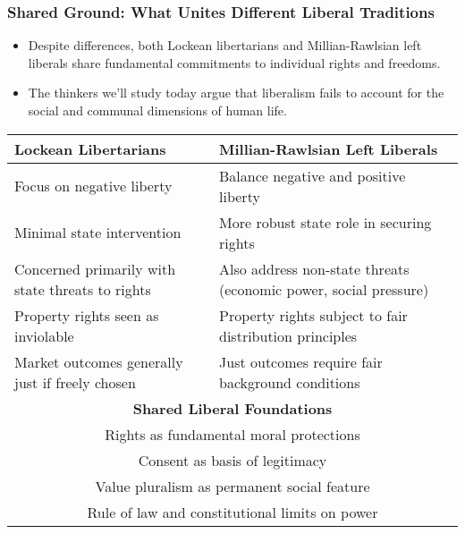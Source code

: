 \documentclass{beamer}
\begin{document}
\begin{frame}
    \frametitle{Shared Ground: What Unites Different Liberal Traditions}
    \begin{itemize}
        \item Despite differences, both Lockean libertarians and Millian-Rawlsian left liberals share fundamental commitments to individual rights and freedoms.
        \item The thinkers we'll study today argue that liberalism fails to account for the social and communal dimensions of human life.
    \end{itemize}
    
    \begin{center}
        \scriptsize
    \begin{tabular}{p{5cm}|p{5cm}}
      \toprule
    \textbf{Lockean Libertarians} & \textbf{Millian-Rawlsian Left Liberals} \\
    \midrule
  
    Focus on negative liberty & Balance negative and positive liberty \\
    Minimal state intervention & More robust state role in securing rights \\
    Concerned primarily with state threats to rights & Also address non-state threats (economic power, social pressure) \\
    Property rights seen as inviolable & Property rights subject to fair distribution principles \\
    Market outcomes generally just if freely chosen & Just outcomes require fair background conditions \\
    \midrule
    \multicolumn{2}{c}{\textbf{Shared Liberal Foundations}} \\
    \multicolumn{2}{c}{Rights as fundamental moral protections} \\
    \multicolumn{2}{c}{Consent as basis of legitimacy} \\
    \multicolumn{2}{c}{Value pluralism as permanent social feature} \\
    \multicolumn{2}{c}{Rule of law and constitutional limits on power} \\
    \bottomrule
    \end{tabular}
    \end{center}
    \end{frame}
\end{document}
